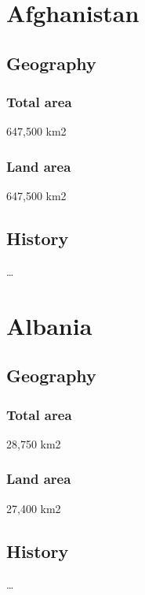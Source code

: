 \documentclass{article}
\begin{document}
\dosecttoc[e]
\faketableofcontents

\section{Afghanistan}
\secttoc
\subsection{Geography}
\subsubsection{Total area}
    647,500 km2
\subsubsection{Land area}
    647,500 km2
\subsection{History} \ldots

\section{Albania}
\secttoc
\subsection{Geography}
\subsubsection{Total area}
    28,750 km2
\subsubsection{Land area}
    27,400 km2
\subsection{History} \ldots
\end{document}
